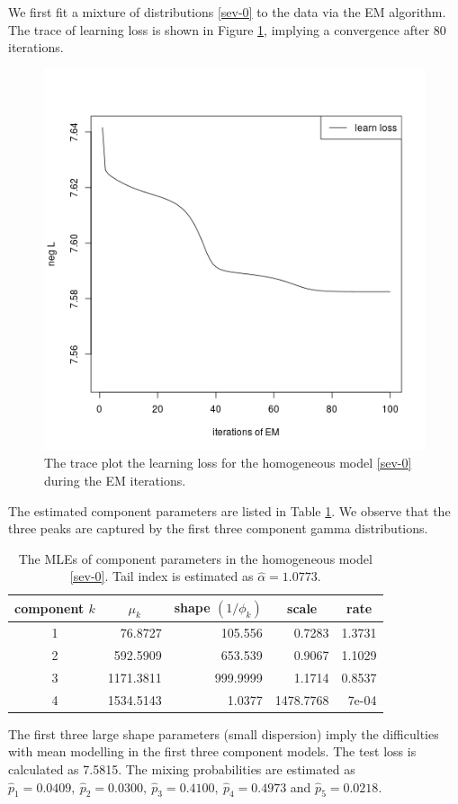 \documentclass[11pt]{article}
\numberwithin{equation}{section}
\begin{document}
We first fit a mixture of distributions \eqref{sev-0} to the data via the EM algorithm. 
The trace of learning loss is shown in Figure \ref{null_sev}, implying a convergence after 80 iterations.
	\begin{figure}[h!]
		\centering
		\includegraphics[width=0.4\linewidth]{../plots/sev/null_trace}
		\caption{The trace plot the learning loss for the homogeneous model \eqref{sev-0} during the EM iterations.}\label{null_sev}
	\end{figure}
The estimated component parameters are listed in Table \ref{null-gamma}. We observe that the three peaks are captured by the first three component gamma distributions.
	\begin{table}[h!]
		\centering
		\caption{The MLEs of component parameters in the homogeneous model \eqref{sev-0}. Tail index is estimated as $\hat{\alpha}=1.0773$.}\label{null-gamma}
		\begin{tabular}{crrrr}
			\hline
			component $k$ & \multicolumn{1}{c}{$\mu_k$} & \multicolumn{1}{c}{shape $(1/\phi_k)$} & \multicolumn{1}{c}{scale} & \multicolumn{1}{c}{rate} \\ \hline
			1         & 76.8727                & 105.556                   & 0.7283                    & 1.3731                   \\
			2         & 592.5909               & 653.539                   & 0.9067                    & 1.1029                   \\
			3         & 1171.3811              & 999.9999                  & 1.1714                    & 0.8537                   \\
			4         & 1534.5143              & 1.0377                    & 1478.7768                 & 7e-04                    \\ \hline
		\end{tabular}
	\end{table}
	The first three large shape parameters (small dispersion) imply the  difficulties with {mean modelling} in the first three component models.
	 The test loss is calculated as 7.5815. The mixing probabilities are estimated as $\hat{p}_1=0.0409,~ \hat{p}_2=0.0300, ~\hat{p}_3=0.4100,~ \hat{p}_4=0.4973$ and $\hat{p}_5=0.0218.$
\end{document}
